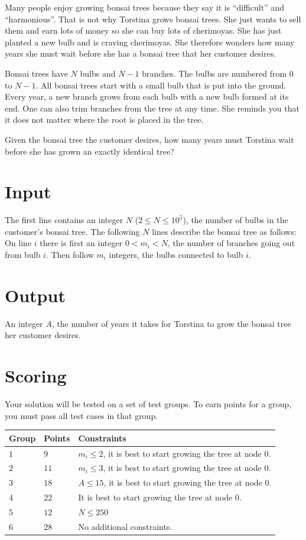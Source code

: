 Many people enjoy growing bonsai trees because they say it is ``difficult'' and ``harmonious''. That is not why Torstina grows bonsai trees. She just wants to sell them and earn lots of money so she can buy lots of cherimoyas. She has just planted a new bulb and is craving cherimoyas. She therefore wonders how many years she must wait before she has a bonsai tree that her customer desires.

Bonsai trees have $N$ bulbs and $N-1$ branches. The bulbs are numbered from 0 to $N-1$. All bonsai trees start with a small bulb that is put into the ground. Every year, a new branch grows from each bulb with a new bulb formed at its end. One can also trim branches from the tree at any time. She reminds you that it does not matter where the root is placed in the tree.

Given the bonsai tree the customer desires, how many years must Torstina wait before she has grown an exactly identical tree?

\section*{Input}
The first line contains an integer $N$ ($2 \leq N \leq 10^5$), the number of bulbs in the customer's bonsai tree.
The following $N$ lines describe the bonsai tree as follows:
On line $i$ there is first an integer $0 < m_i < N$, the number of branches going out from bulb $i$. Then follow $m_i$ integers, the bulbs connected to bulb $i$.

\section*{Output}
An integer $A$, the number of years it takes for Torstina to grow the bonsai tree her customer desires.

\section*{Scoring}
Your solution will be tested on a set of test groups.
To earn points for a group, you must pass all test cases in that group.

\noindent
\begin{tabular}{| l | l | p{12cm} |}
  \hline
  \textbf{Group} & \textbf{Points} & \textbf{Constraints} \\ \hline
  $1$   & $9$        & $m_i\leq 2$, it is best to start growing the tree at node 0. \\ \hline
  $2$   & $11$       & $m_i \leq 3$, it is best to start growing the tree at node 0. \\ \hline
  $3$   & $18$       & $A \leq 15$, it is best to start growing the tree at node 0. \\ \hline
  $4$   & $22$       & It is best to start growing the tree at node 0. \\ \hline
  $5$   & $12$       & $N \leq 250$ \\ \hline
  $6$   & $28$       & No additional constraints. \\ \hline
\end{tabular}


